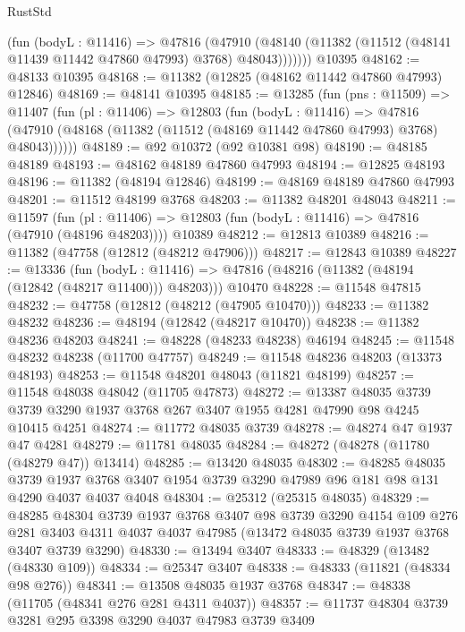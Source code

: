 \begin{lexlean}{RustStd}
\begin{coremodule}
          (fun (bodyL : @11416) =>
          @47816
            (@47910
              (@48140 (@11382 (@11512 (@48141 @11439 @11442 @47860 @47993) @3768) @48043)))))))
    @10395
@48162 := @48133 @10395
@48168 := @11382 (@12825 (@48162 @11442 @47860 @47993) @12846)
@48169 := @48141 @10395
@48185 := @13285
    (fun (pns : @11509) =>
    @11407
      (fun (pl : @11406) =>
      @12803
        (fun (bodyL : @11416) =>
        @47816 (@47910 (@48168 (@11382 (@11512 (@48169 @11442 @47860 @47993) @3768) @48043))))))
@48189 := @92 @10372 (@92 @10381 @98)
@48190 := @48185 @48189
@48193 := @48162 @48189 @47860 @47993
@48194 := @12825 @48193
@48196 := @11382 (@48194 @12846)
@48199 := @48169 @48189 @47860 @47993
@48201 := @11512 @48199 @3768
@48203 := @11382 @48201 @48043
@48211 := @11597
    (fun (pl : @11406) => @12803 (fun (bodyL : @11416) => @47816 (@47910 (@48196 @48203))))
    @10389
@48212 := @12813 @10389
@48216 := @11382 (@47758 (@12812 (@48212 @47906)))
@48217 := @12843 @10389
@48227 := @13336
    (fun (bodyL : @11416) => @47816 (@48216 (@11382 (@48194 (@12842 (@48217 @11400))) @48203)))
    @10470
@48228 := @11548 @47815
@48232 := @47758 (@12812 (@48212 (@47905 @10470)))
@48233 := @11382 @48232
@48236 := @48194 (@12842 (@48217 @10470))
@48238 := @11382 @48236 @48203
@48241 := @48228 (@48233 @48238) @46194
@48245 := @11548 @48232 @48238 (@11700 @47757)
@48249 := @11548 @48236 @48203 (@13373 @48193)
@48253 := @11548 @48201 @48043 (@11821 @48199)
@48257 := @11548 @48038 @48042 (@11705 @47873)
@48272 := @13387
    @48035
    @3739
    @3739
    @3290
    @1937
    @3768
    @267
    @3407
    @1955
    @4281
    @47990
    @98
    @4245
    @10415
    @4251
@48274 := @11772 @48035 @3739
@48278 := @48274 @47 @1937 @47 @4281
@48279 := @11781 @48035
@48284 := @48272 (@48278 (@11780 (@48279 @47)) @13414)
@48285 := @13420 @48035
@48302 := @48285
    @48035
    @3739
    @1937
    @3768
    @3407
    @1954
    @3739
    @3290
    @47989
    @96
    @181
    @98
    @131
    @4290
    @4037
    @4037
    @4048
@48304 := @25312 (@25315 @48035)
@48329 := @48285
    @48304
    @3739
    @1937
    @3768
    @3407
    @98
    @3739
    @3290
    @4154
    @109
    @276
    @281
    @3403
    @4311
    @4037
    @4037
    @47985
    (@13472 @48035 @3739 @1937 @3768 @3407 @3739 @3290)
@48330 := @13494 @3407
@48333 := @48329 (@13482 (@48330 @109))
@48334 := @25347 @3407
@48338 := @48333 (@11821 (@48334 @98 @276))
@48341 := @13508 @48035 @1937 @3768
@48347 := @48338 (@11705 (@48341 @276 @281 @4311 @4037))
@48357 := @11737 @48304 @3739 @3281 @295 @3398 @3290 @4037 @47983 @3739 @3409

\end{coremodule}
\end{lexlean}
